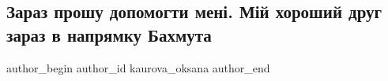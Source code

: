  
 
 
 
 

\subsection{Зараз прошу допомогти мені. Мій хороший друг зараз в напрямку Бахмута}
\label{sec:08_01_2023.fb.kaurova_oksana.1.zaraz_proshu_dopomog}

\ifcmt
 author_begin
   author_id kaurova_oksana
 author_end
\fi
